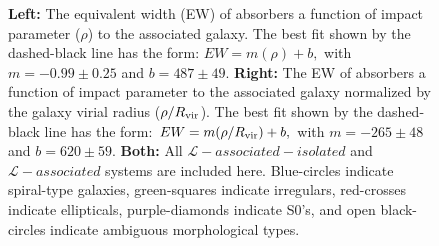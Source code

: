 \documentclass[twocolumn,tighten]{aastex62}
\begin{document}
\begin{figure}[t!]
        \centering
        \vspace{0pt}
        \caption{\small{\textbf{Left: } The equivalent width (EW) of absorbers a function of impact parameter ($\rho$) to the associated galaxy. The best fit shown by the dashed-black line has the form: $EW = m (\rho) + b,$ with $m = -0.99 \pm 0.25$ and $b = 487 \pm 49$. \textbf{Right:} The EW of absorbers a function of impact parameter to the associated galaxy normalized by the galaxy virial radius ($\rho / R_{\rm vir}$). The best fit shown by the dashed-black line has the form: $EW = m (\rho / R_{\rm vir}) + b,$ with $m = -265 \pm 48$ and $b = 620 \pm 59$. \textbf{Both:} All $\mathcal{L}-associated-isolated$ and $\mathcal{L}-associated$ systems are included here. Blue-circles indicate spiral-type galaxies, green-squares indicate irregulars, red-crosses indicate ellipticals, purple-diamonds indicate S0's, and open black-circles indicate ambiguous morphological types. }}
        \vspace{5pt}
        \label{ew_both}
\end{figure}
\end{document}
